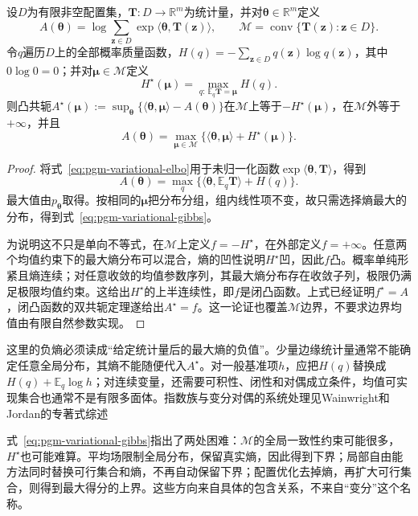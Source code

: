 \begin{theorem}[配分函数与最大熵的对偶]
  \label{thm:pgm-variational-entropy-duality}
  设$D$为有限非空配置集，$\bm T:D\to\mathbb R^m$为统计量，并对$\bm{\theta}\in\mathbb R^m$定义
  \[
    A(\bm{\theta})
      =\log\sum_{\bm z\in D}
        \exp\langle\bm{\theta},\bm T(\bm z)\rangle,
    \qquad
    \mathcal M=\operatorname{conv}
      \{\bm T(\bm z):\bm z\in D\}.
  \]
  令$q$遍历$D$上的全部概率质量函数，$H(q)=-\sum_{\bm z\in D}q(\bm z)\log q(\bm z)$，其中$0\log0=0$；并对$\bm{\mu}\in\mathcal M$定义
  \[
    H^\star(\bm{\mu})
       =\max_{q:\,\mathbb E_q\bm T=\bm{\mu}}H(q).
  \]
  则凸共轭$A^\star(\bm{\mu}):=\sup_{\bm{\theta}}\{\langle\bm{\theta},\bm{\mu}\rangle-A(\bm{\theta})\}$在$\mathcal M$上等于$-H^\star(\bm{\mu})$，在$\mathcal M$外等于$+\infty$，并且
  \begin{equation}
    A(\bm{\theta})
      =\max_{\bm{\mu}\in\mathcal M}
        \{\langle\bm{\theta},\bm{\mu}\rangle+H^\star(\bm{\mu})\}.
    \label{eq:pgm-variational-gibbs}
  \end{equation}
\end{theorem}
\begin{proof}
  将式~\eqref{eq:pgm-variational-elbo}用于未归一化函数$\exp\langle\bm{\theta},\bm T\rangle$，得到
  \[
    A(\bm{\theta})
      =\max_q\{\langle\bm{\theta},\mathbb E_q\bm T\rangle+H(q)\}.
  \]
  最大值由$p_{\bm{\theta}}$取得。按相同的$\bm{\mu}$把分布分组，组内线性项不变，故只需选择熵最大的分布，得到式~\eqref{eq:pgm-variational-gibbs}。

  为说明这不只是单向不等式，在$\mathcal M$上定义$f=-H^\star$，在外部定义$f=+\infty$。任意两个均值约束下的最大熵分布可以混合，熵的凹性说明$H^\star$凹，因此$f$凸。概率单纯形紧且熵连续；对任意收敛的均值参数序列，其最大熵分布存在收敛子列，极限仍满足极限均值约束。这给出$H^\star$的上半连续性，即$f$是闭凸函数。上式已经证明$f^\star=A$，闭凸函数的双共轭定理遂给出$A^\star=f$。这一论证也覆盖$\mathcal M$边界，不要求边界均值由有限自然参数实现。
\end{proof}

这里的负熵必须读成“给定统计量后的最大熵的负值”。少量边缘统计量通常不能确定任意全局分布，其熵不能随便代入$A^\star$。对一般基准项$h$，应把$H(q)$替换成$H(q)+\mathbb E_q\log h$；对连续变量，还需要可积性、闭性和对偶成立条件，均值可实现集合也通常不是有限多面体。指数族与变分对偶的系统处理见Wainwright和Jordan的专著式综述

式~\eqref{eq:pgm-variational-gibbs}指出了两处困难：$\mathcal M$的全局一致性约束可能很多，$H^\star$也可能难算。平均场限制全局分布，保留真实熵，因此得到下界；局部自由能方法同时替换可行集合和熵，不再自动保留下界；配置优化去掉熵，再扩大可行集合，则得到最大得分的上界。这些方向来自具体的包含关系，不来自“变分”这个名称。

